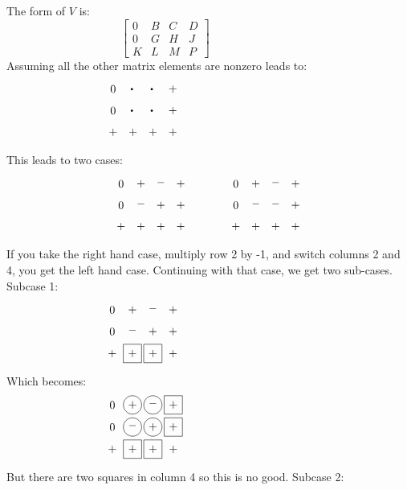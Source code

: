 The form of $V$ is:
\begin{equation*}
\begin{bmatrix}
0 & B & C & D \\
0 & G & H & J \\
K & L & M & P
\end{bmatrix}
~~~~~~~~~~~~~~~~~~~~~~~~~~~~~~~~~~~
\end{equation*}
Assuming all the other matrix elements are nonzero leads to:
\begin{equation*}
\myarrset
\begin{array}{cccc}
\ndcz & \ndcd & \ndcd & \ndcp \\
\ndcz & \ndcd & \ndsd & \ndcp \\
\ndsp & \ndcp & \ndcp & \ndsp
\end{array}
~~~~~~~~~~~~~~~~~~~~~~~~~~~~~~~~~~~
\end{equation*}
This leads to two cases:
\begin{equation*}
\myarrset
\begin{array}{ccccccccc}
\ndcz & \ndcp & \ndcm & \ndcp & ~~~~~~~~~ & \ndcz & \ndcp & \ndcm & \ndcp \\
\ndcz & \ndcm & \ndcp & \ndcp & ~~~~~~~~~ & \ndcz & \ndcm & \ndcm & \ndcp \\
\ndcp & \ndcp & \ndcp & \ndcp & ~~~~~~~~~ & \ndcp & \ndcp & \ndcp & \ndcp
\end{array}
\end{equation*}
If you take the right hand case, multiply row 2 by -1, and switch columns 2
and 4, you get the left hand case.  Continuing with that case, we get two
sub-cases.  Subcase 1:
\begin{equation*}
\myarrset
\begin{array}{cccc}
\ndcz & \ndcp & \ndcm & \ndcp \\
\ndcz & \ndcm & \ndcp & \ndcp \\
\ndcp & \dsp  & \dsp  & \ndcp
\end{array}
~~~~~~~~~~~~~~~~~~~~~~~~~~~~~~~~~~~
\end{equation*}
Which becomes:
\begin{equation*}
\myarrset
\begin{array}{cccc}
\ndcz & \dcp  & \dcm  & \dsp  \\
\ndcz & \dcm  & \dcp  & \dsp  \\
\ndcp & \dsp  & \dsp  & \ndcp
\end{array}
~~~~~~~~~~~~~~~~~~~~~~~~~~~~~~~~~~~
\end{equation*}
But there are two squares in column 4 so this is no good.  Subcase 2:
